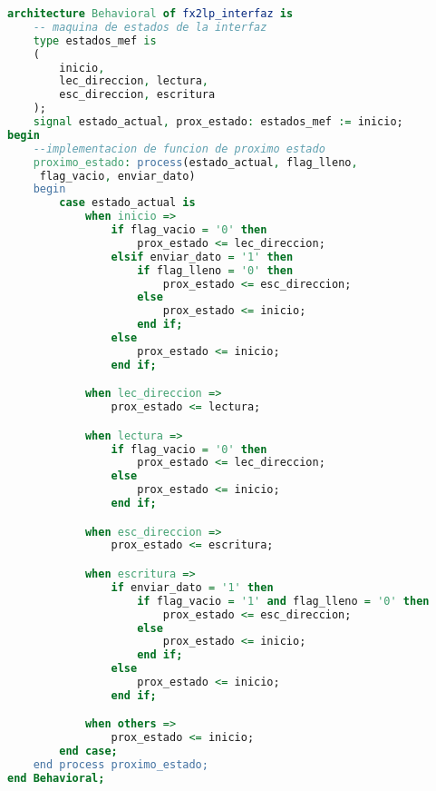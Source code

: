 \begin{lstlisting}[language=VHDL,backgroundcolor=\color{gray!30}]
architecture Behavioral of fx2lp_interfaz is
	-- maquina de estados de la interfaz
	type estados_mef is
	(
		inicio,
		lec_direccion, lectura,
		esc_direccion, escritura
	);
	signal estado_actual, prox_estado: estados_mef := inicio;
begin
	--implementacion de funcion de proximo estado
	proximo_estado: process(estado_actual, flag_lleno,
	 flag_vacio, enviar_dato)
	begin
		case estado_actual is
			when inicio =>
				if flag_vacio = '0' then
					prox_estado <= lec_direccion;
				elsif enviar_dato = '1' then
					if flag_lleno = '0' then
						prox_estado <= esc_direccion;
					else
						prox_estado <= inicio;
					end if;
				else
					prox_estado <= inicio;
				end if;

			when lec_direccion =>
				prox_estado <= lectura;

			when lectura =>
				if flag_vacio = '0' then
					prox_estado <= lec_direccion;
				else
					prox_estado <= inicio;
				end if;

			when esc_direccion =>
				prox_estado <= escritura;

			when escritura =>
				if enviar_dato = '1' then
					if flag_vacio = '1' and flag_lleno = '0' then
						prox_estado <= esc_direccion;
					else
						prox_estado <= inicio;
					end if;
				else
					prox_estado <= inicio;
				end if;

			when others =>
				prox_estado <= inicio;
		end case;
	end process proximo_estado;
end Behavioral;
\end{lstlisting}




